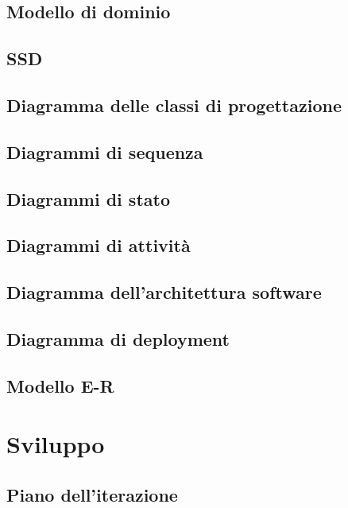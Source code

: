 \documentclass[12pt]{article}
\begin{document}
\subsection{Modello di dominio}
\subsection{SSD}
\subsection{Diagramma delle classi di progettazione}
\subsection{Diagrammi di sequenza}
\subsection{Diagrammi di stato}
\subsection{Diagrammi di attivit\`{a}}
\subsection{Diagramma dell'architettura software}
\subsection{Diagramma di deployment}
\subsection{Modello E-R}
\section{Sviluppo}
\subsection{Piano dell'iterazione}



\end{document}
